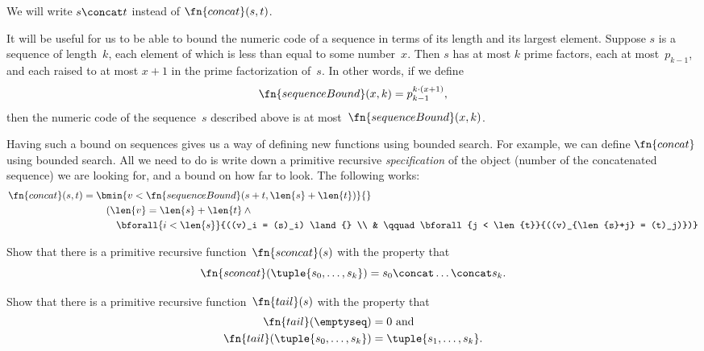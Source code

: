 \documentclass[../../../include/open-logic-section]{subfiles}
\begin{document}
We will write $s \concat t$ instead of $\fn{concat}(s,t)$.

It will be useful for us to be able to bound the numeric code of a
sequence in terms of its length and its largest element. Suppose $s$
is a sequence of length~$k$, each element of which is less than equal
to some number~$x$. Then $s$ has at most $k$ prime factors, each at
most~$p_{k-1}$, and each raised to at most $x+1$ in the prime
factorization of~$s$. In other words, if we define
\[
\fn{sequenceBound}(x,k) = p_{k-1}^{k \cdot (x+1)},
\]
then the numeric code of the sequence~$s$ described above is at
most~$\fn{sequenceBound}(x,k)$.

Having such a bound on sequences gives us a way of defining new
functions using bounded search. For example, we can define
$\fn{concat}$ using bounded search. All we need to do is write down a
primitive recursive \emph{specification} of the object (number of the
concatenated sequence) we are looking for, and a bound on how far to
look. The following works:
\begin{align*}
  \fn{concat}(s,t) = {} & \bmin{v < \fn{sequenceBound}(s+t,\len{s} +
    \len{t})}{} \\
  & \quad(\len{v} = \len{s} + \len{t} \land {}\\
    & \qquad \bforall{i < \len{s}}{((v)_i = (s)_i) \land {} \\
      & \qquad \bforall{j < \len{t}}{((v)_{\len{s}+j} = (t)_j)})}
\end{align*}

\begin{prob}
Show that there is a primitive recursive function~$\fn{sconcat}(s)$
with the property that
\[
\fn{sconcat}(\tuple{s_0, \dots, s_k}) = s_0 \concat \dots \concat s_k.
\]
\end{prob}

\begin{prob}
Show that there is a primitive recursive function~$\fn{tail}(s)$
with the property that
\begin{align*}
  \fn{tail}(\emptyseq) & = 0 \text{ and}\\
  \fn{tail}(\tuple{s_0, \dots, s_{k}}) & = \tuple{s_1, \dots, s_{k}}.
\end{align*}
\end{prob}
\end{document}
